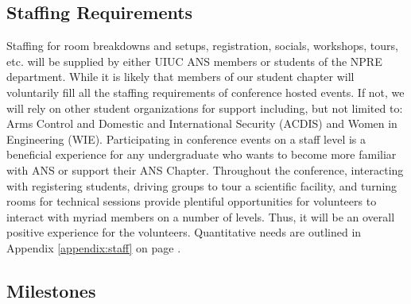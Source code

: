 \subsection{Staffing Requirements}
Staffing for room breakdowns and setups, registration, socials, workshops,
tours, etc.  will be supplied by either UIUC ANS members or students of the
NPRE department. While it is likely that members of our student chapter will
voluntarily fill all the staffing requirements of conference hosted events. If
not, we will rely on other student organizations for support including, but not
limited to: Arms Control and Domestic and International Security (ACDIS) and
Women in Engineering (WIE). Participating in conference events on a staff level
is a beneficial experience for any undergraduate who wants to become more
familiar with ANS or support their ANS Chapter. Throughout the conference,
interacting with registering students, driving groups to tour a scientific
facility, and turning rooms for technical sessions provide plentiful
opportunities for volunteers to interact with myriad members on a number of
levels. Thus, it will be an overall positive experience for the volunteers.
Quantitative needs are outlined in Appendix \ref{appendix:staff} on page
\pageref{appendix:staff}.

\newpage
\subsection{Milestones}

